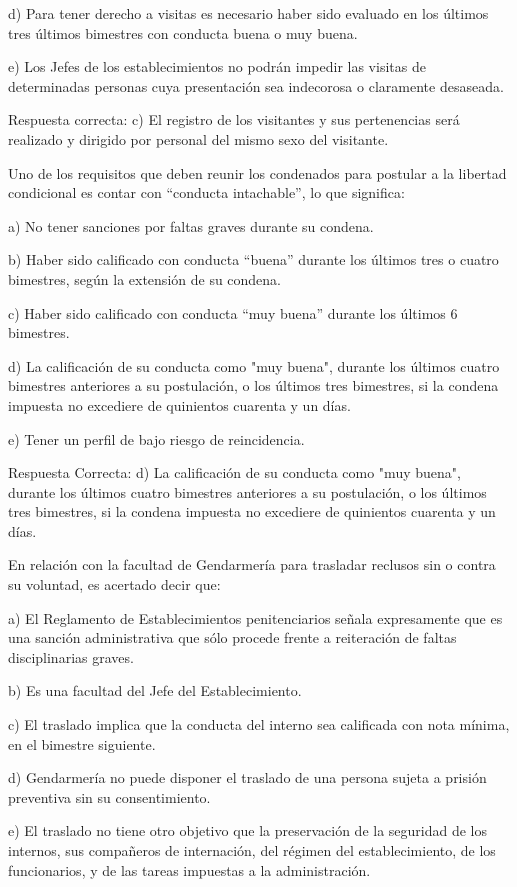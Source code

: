 \documentclass[letterpaper, 11pt]{article}
\begin{document}
d) Para tener derecho a visitas es necesario haber sido evaluado en los últimos tres últimos
bimestres con conducta buena o muy buena.

e) Los Jefes de los establecimientos no podrán impedir las visitas de determinadas
personas cuya presentación sea indecorosa o claramente desaseada.

Respuesta correcta:
c) El registro de los visitantes y sus pertenencias será realizado
y dirigido por personal del mismo sexo del visitante.

Uno de los requisitos que deben reunir los condenados para postular a la libertad
condicional es contar con “conducta intachable”, lo que significa:

a) No tener sanciones por faltas graves durante su condena.

b) Haber sido calificado con conducta “buena” durante los últimos tres o cuatro bimestres,
según la extensión de su condena.

c) Haber sido calificado con conducta “muy buena” durante los últimos 6 bimestres.

d) La calificación de su conducta como "muy buena", durante los últimos cuatro bimestres
anteriores a su postulación, o los últimos tres bimestres, si la condena impuesta no
excediere de quinientos cuarenta y un días.

e) Tener un perfil de bajo riesgo de reincidencia.

Respuesta Correcta:
d) La calificación de su conducta como "muy buena", durante
los últimos cuatro bimestres anteriores a su postulación, o los últimos tres
bimestres, si la condena impuesta no excediere de quinientos cuarenta y un días.


En relación con la facultad de Gendarmería para trasladar reclusos sin o contra su
voluntad, es acertado decir que:

a) El Reglamento de Establecimientos penitenciarios señala expresamente que es una
sanción administrativa que sólo procede frente a reiteración de faltas disciplinarias graves.

b) Es una facultad del Jefe del Establecimiento.

c) El traslado implica que la conducta del interno sea calificada con nota mínima, en el
bimestre siguiente.

d) Gendarmería no puede disponer el traslado de una persona sujeta a prisión preventiva
sin su consentimiento.

e) El traslado no tiene otro objetivo que la preservación de la seguridad de los internos, sus
compañeros de internación, del régimen del establecimiento, de los funcionarios, y de las
tareas impuestas a la administración.
\end{document}
